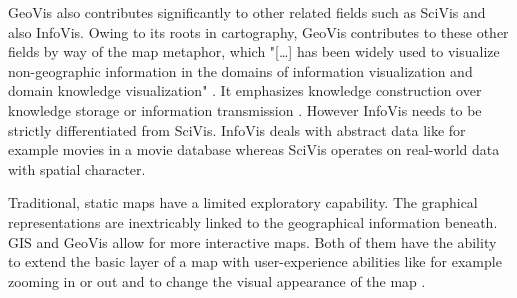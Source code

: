 \ac{GeoVis} also contributes significantly to other related fields such as \ac{SciVis} and also \ac{InfoVis}. Owing to its roots in cartography, \ac{GeoVis} contributes to these other fields by way of the map metaphor, which "[\ldots] has been widely used to visualize non-geographic information in the domains of information visualization and domain knowledge visualization" . It emphasizes knowledge construction over knowledge storage or information transmission . However \ac{InfoVis} needs to be strictly differentiated from \ac{SciVis}. \ac{InfoVis} deals with abstract data like for example movies in a movie database whereas \ac{SciVis} operates on real-world data with spatial character.

Traditional, static maps have a limited exploratory capability. The graphical representations are inextricably linked to the geographical information beneath. \ac{GIS} and \ac{GeoVis} allow for more interactive maps. Both of them have the ability to extend the basic layer of a map with user-experience abilities like for example zooming in or out and to change the visual appearance of the map .

